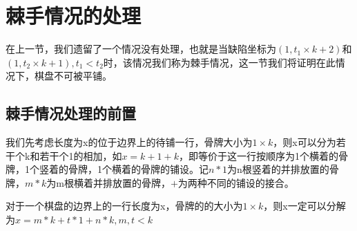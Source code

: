 \chapter{棘手情况的处理}
在上一节，我们遗留了一个情况没有处理，也就是当缺陷坐标为$(1, t_1 \times k + 2)$和$(1, t_2 \times k + 1), t_1 < t_2$时，该情况我们称为棘手情况，这一节我们将证明在此情况下，棋盘不可被平铺。
\section{棘手情况处理的前置}
我们先考虑长度为x的位于边界上的待铺一行，骨牌大小为$1 \times k$，则x可以分为若干个k和若干个1的相加，如$x = k + 1 + k$，即等价于这一行按顺序为1个横着的骨牌，1个竖着的骨牌，1个横着的骨牌的铺设。记$n * 1$为n根竖着的并排放置的骨牌，$m * k$为m根横着并排放置的骨牌，$+$为两种不同的铺设的接合。
\begin{theorem}
    对于一个棋盘的边界上的一行长度为x，骨牌的的大小为$1 \times k$，则x一定可以分解为$x = m * k + t * 1 + n * k, m, t < k$

    \label{basic-theorem-4}
\end{theorem}
